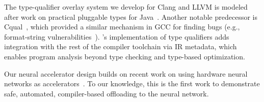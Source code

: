 The type-qualifier overlay system we develop for Clang and LLVM is modeled
after work on practical pluggable types for Java~\cite{jsr308, papi}.
%
Another notable predecessor is Cqual~\cite{cqual}, which provided a similar mechanism
in GCC for finding bugs (e.g., format-string
vulnerabilities~\cite{shankar:typequal}).
\sysname's implementation of type qualifiers adds integration with the rest of
the compiler toolchain via IR metadata, which enables program analysis beyond
type checking and type-based optimization.

Our neural accelerator design builds on recent work on using hardware neural
networks as accelerators~\cite{npu, anpu, temam-isca13}.
To our knowledge, this is the first work
to demonstrate safe, automated, compiler-based offloading to the neural network.
